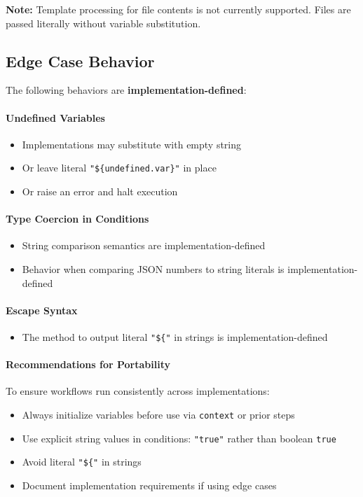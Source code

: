 \documentclass[11pt,a4paper]{article}
\begin{document}
\textbf{Note:} Template processing for file contents is not currently supported. Files are passed literally without variable substitution.

\subsection{Edge Case Behavior}

The following behaviors are \textbf{implementation-defined}:

\paragraph{Undefined Variables}
\begin{itemize}
    \item Implementations may substitute with empty string
    \item Or leave literal \texttt{"\$\{undefined.var\}"} in place
    \item Or raise an error and halt execution
\end{itemize}

\paragraph{Type Coercion in Conditions}
\begin{itemize}
    \item String comparison semantics are implementation-defined
    \item Behavior when comparing JSON numbers to string literals is implementation-defined
\end{itemize}

\paragraph{Escape Syntax}
\begin{itemize}
    \item The method to output literal \texttt{"\$\{"} in strings is implementation-defined
\end{itemize}

\paragraph{Recommendations for Portability}

To ensure workflows run consistently across implementations:
\begin{itemize}
    \item Always initialize variables before use via \texttt{context} or prior steps
    \item Use explicit string values in conditions: \texttt{"true"} rather than boolean \texttt{true}
    \item Avoid literal \texttt{"\$\{"} in strings
    \item Document implementation requirements if using edge cases
\end{itemize}
\end{document}
